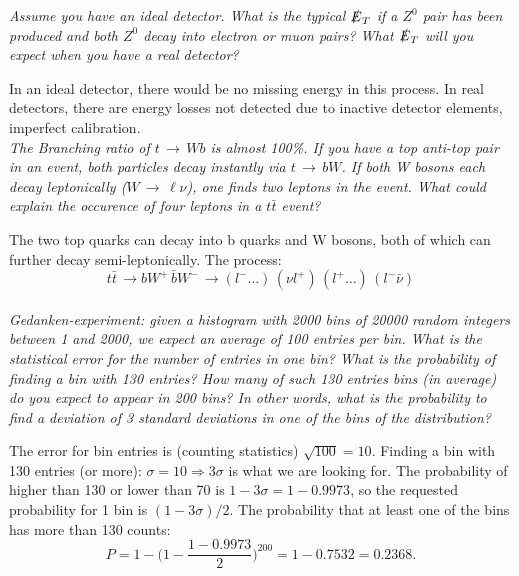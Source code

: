 \documentclass[twocolumn]{article}
\begin{document}
\textit{Assume you have an ideal detector. What is the typical $\slashed{E}_T$ if a $Z^0$ pair has been produced and both $Z^0$ decay into electron or muon pairs? What $\slashed{E}_T$ will you expect when you have a real detector?}\\
\par In an ideal detector, there would be no missing energy in this process. In real detectors, there are energy losses not detected due to inactive detector elements, imperfect calibration.\\[14pt]
\textit{The Branching ratio of $t \, \rightarrow \, Wb$ is almost 100\%. If you have a top anti-top pair in an event, both particles decay instantly via $t \, \rightarrow \, bW$. If both W bosons each decay leptonically ($W \, \rightarrow \, \ell \nu$), one finds two leptons in the event. What could explain the occurence of four leptons in a $t \bar{t}$ event?}\\
\par The two top quarks can decay into b quarks and W bosons, both of which can further decay semi-leptonically. The process: 
\begin{equation}
t \bar{t} \, \rightarrow bW^+ \, \bar{b}W^- \, \rightarrow (l^- \ldots ) \, (\nu l^+) \, (l^+ \ldots) \, (l^- \bar{\nu})\nonumber
\end{equation}\\
\textit{Gedanken-experiment: given a histogram with 2000 bins of 20000 random integers between 1 and 2000, we expect an average of 100 entries per bin. What is the statistical error for the number of entries in one bin? What is the probability of finding a bin with 130 entries? How many of such 130 entries bins (in average) do you expect to appear in 200 bins? In other words, what is the probability to find a deviation of 3 standard deviations in one of the bins of the distribution?}\\
\par The error for bin entries is (counting statistics) $\sqrt{100} = 10$. Finding a bin with 130 entries (or more): $\sigma = 10 \Rightarrow 3\sigma$ is what we are looking for. The probability of higher than 130 or lower than 70 is $ 1- 3 \sigma = 1-0.9973$, so the requested probability for 1 bin is $(1-3\sigma)/2$. The probability that at least one of the bins has more than 130 counts:
\begin{equation}
P = 1 - \Big( 1 - \frac{1- 0.9973}{2} \Big)^{200} = 1-0.7532 = 0.2368.
\end{equation} 
\newpage
\end{document}
